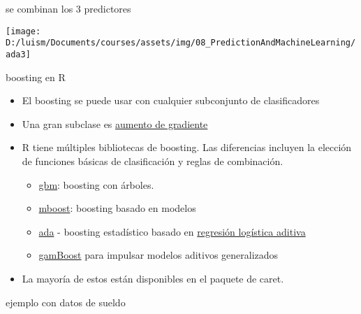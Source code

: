 \documentclass[
]{article}
\providecommand{\tightlist}{%
  \setlength{\itemsep}{0pt}\setlength{\parskip}{0pt}}
\begin{document}
se combinan los 3 predictores

\begin{center}\texttt{[image: D:/luism/Documents/courses/assets/img/08\_PredictionAndMachineLearning/ada3]} \end{center}

boosting en R

\begin{itemize}
\tightlist
\item
  El boosting se puede usar con cualquier subconjunto de clasificadores
\item
  Una gran subclase es
  \href{http://en.wikipedia.org/wiki/Gradient_boosting}{aumento de
  gradiente}
\item
  R tiene múltiples bibliotecas de boosting. Las diferencias incluyen la
  elección de funciones básicas de clasificación y reglas de
  combinación.

  \begin{itemize}
  \tightlist
  \item
    \href{http://cran.r-project.org/web/packages/gbm/index.html}{gbm}:
    boosting con árboles.
  \item
    \href{http://cran.r-project.org/web/packages/mboost/index.html}{mboost}:
    boosting basado en modelos
  \item
    \href{http://cran.r-project.org/web/packages/ada/index.html}{ada} -
    boosting estadístico basado en
    \href{http://projecteuclid.org/DPubS?service=\%20UI\%20\&\%20version\%20=\%201.0\%20\&\%20verb\%20=\%20Display\%20\&\%20handle\%20=\%20euclid.aos\%20/\%201016218223}{regresión
    logística aditiva}
  \item
    \href{http://cran.r-project.org/web/packages/GAMBoost/index.html}{gamBoost}
    para impulsar modelos aditivos generalizados
  \end{itemize}
\item
  La mayoría de estos están disponibles en el paquete de caret.
\end{itemize}

ejemplo con datos de sueldo
\end{document}
